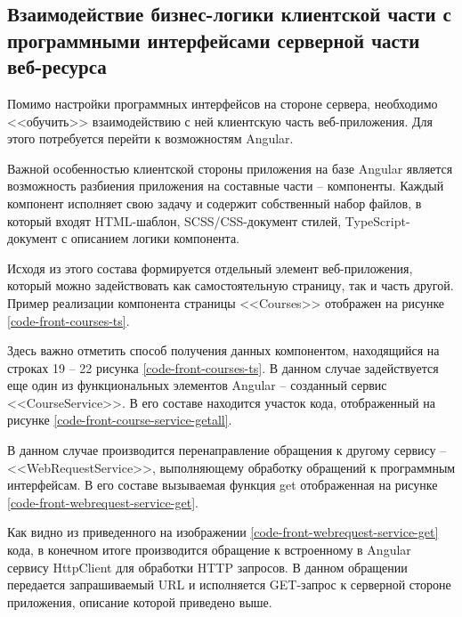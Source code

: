 \subsection{Взаимодействие бизнес-логики клиентской части с программными интерфейсами серверной части веб-ресурса}

Помимо настройки программных интерфейсов на стороне сервера, необходимо <<обучить>> взаимодействию с ней клиентскую часть веб-приложения.
Для этого потребуется перейти к возможностям Angular.

Важной особенностью клиентской стороны приложения на базе Angular является возможность разбиения приложения на составные части -- компоненты.
Каждый компонент исполняет свою задачу и содержит собственный набор файлов, в который входят HTML-шаблон, SCSS/CSS-документ стилей, TypeScript-документ с описанием логики компонента.

Исходя из этого состава формируется отдельный элемент веб-приложения, который можно задействовать как самостоятельную страницу, так и часть другой.
Пример реализации компонента страницы <<Courses>> отображен на рисунке \ref{code-front-courses-ts}.


Здесь важно отметить способ получения данных компонентом, находящийся на строках 19 -- 22 рисунка \ref{code-front-courses-ts}.
В данном случае задействуется еще один из функциональных элементов Angular -- созданный сервис <<CourseService>>.
В его составе находится участок кода, отображенный на рисунке \ref{code-front-course-service-getall}.


В данном случае производится перенаправление обращения к другому сервису -- <<WebRequestService>>, выполняющему обработку обращений к программным интерфейсам.
В его составе вызываемая функция get отображенная на рисунке \ref{code-front-webrequest-service-get}.


Как видно из приведенного на изображении \ref{code-front-webrequest-service-get} кода, в конечном итоге производится обращение к встроенному в Angular сервису HttpClient для обработки HTTP запросов.
В данном обращении передается запрашиваемый URL и исполняется GET-запрос к серверной стороне приложения, описание которой приведено выше.

